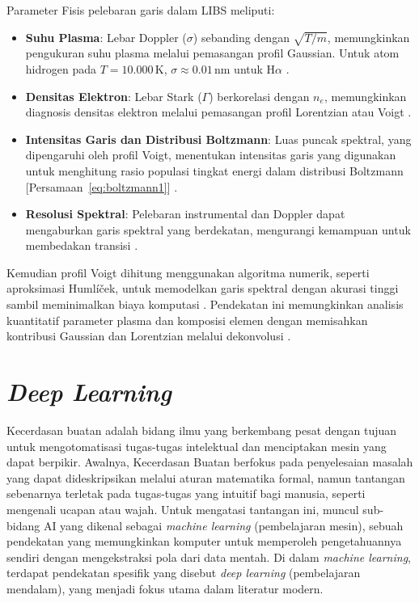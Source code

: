 Parameter Fisis pelebaran garis dalam LIBS meliputi:
\begin{itemize}
  \item \textbf{Suhu Plasma}: Lebar Doppler (\( \sigma \)) sebanding dengan \( \sqrt{T/m} \), memungkinkan pengukuran suhu plasma melalui pemasangan profil Gaussian. Untuk atom hidrogen pada \( T = 10.000 \, \text{K} \), \( \sigma \approx 0.01 \, \text{nm} \) untuk H\(\alpha\) \citep{Demtroder2010}.
  \item \textbf{Densitas Elektron}: Lebar Stark (\( \Gamma \)) berkorelasi dengan \( n_e \), memungkinkan diagnosis densitas elektron melalui pemasangan profil Lorentzian atau Voigt \citep{Griem1997,Konjevic1999}.
  \item \textbf{Intensitas Garis dan Distribusi Boltzmann}: Luas puncak spektral, yang dipengaruhi oleh profil Voigt, menentukan intensitas garis yang digunakan untuk menghitung rasio populasi tingkat energi dalam distribusi Boltzmann [Persamaan~\eqref{eq:boltzmann1}] \citep{Miziolek2006}.
  \item \textbf{Resolusi Spektral}: Pelebaran instrumental dan Doppler dapat mengaburkan garis spektral yang berdekatan, mengurangi kemampuan untuk membedakan transisi \citep{Aragon2008}.
\end{itemize}

Kemudian profil Voigt dihitung menggunakan algoritma numerik, seperti aproksimasi Humlíček, untuk memodelkan garis spektral dengan akurasi tinggi sambil meminimalkan biaya komputasi \citep{Griem1997}. Pendekatan ini memungkinkan analisis kuantitatif parameter plasma dan komposisi elemen dengan memisahkan kontribusi Gaussian dan Lorentzian melalui dekonvolusi \citep{Aragon2008}.




\section{\textit{Deep Learning}}

Kecerdasan buatan  adalah bidang ilmu yang berkembang pesat dengan tujuan untuk mengotomatisasi tugas-tugas intelektual dan menciptakan mesin yang dapat berpikir. Awalnya, Kecerdasan Buatan berfokus pada penyelesaian masalah yang dapat dideskripsikan melalui aturan matematika formal, namun tantangan sebenarnya terletak pada tugas-tugas yang intuitif bagi manusia, seperti mengenali ucapan atau wajah. Untuk mengatasi tantangan ini, muncul sub-bidang AI yang dikenal sebagai \textit{machine learning} (pembelajaran mesin), sebuah pendekatan yang memungkinkan komputer untuk memperoleh pengetahuannya sendiri dengan mengekstraksi pola dari data mentah. Di dalam \textit{machine learning}, terdapat pendekatan spesifik yang disebut \textit{deep learning} (pembelajaran mendalam), yang menjadi fokus utama dalam literatur modern\parencite{Goodfellow2016}.

